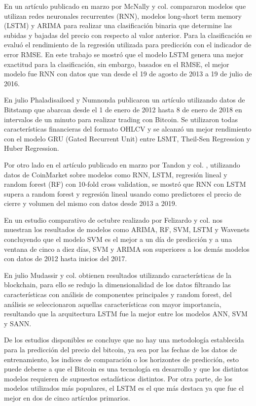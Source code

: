 En un artículo publicado en marzo por McNally y col. \parencite*{mcnallyPredictingPriceBitcoin2018} compararon modelos que utilizan redes neuronales recurrentes (RNN), modelos long-short term memory (LSTM) y ARIMA para realizar una clasificación binaria que determine las subidas y bajadas del precio con respecto al valor anterior. Para la clasificación se evaluó el rendimiento de la regresión utilizada para predicción con el indicador de error RMSE.
En este trabajo se mostró que el modelo LSTM genera una mejor exactitud para la clasificación, sin embargo, basados en el RMSE, el mejor modelo fue RNN con datos que van desde el 19 de agosto de 2013 a 19 de julio de 2016. 

En julio Phaladisailoed y Numnonda \parencite*{phaladisailoedMachineLearningModels2018} publicaron un artículo utilizando datos de Bitstamp que abarcan desde el 1 de enero de 2012 hasta 8 de enero de 2018 en intervalos de un minuto para realizar trading con Bitcoin. Se utilizaron todas características financieras del formato OHLCV y se alcanzó un mejor rendimiento con el modelo GRU (Gated Recurrent Unit) entre LSMT, Theil-Sen Regression y Huber Regression. 


Por otro lado en el artículo publicado en marzo por Tandon y col. \parencite*{tandonBitcoinPriceForecasting2019}, utilizando datos de CoinMarket sobre modelos como RNN, LSTM, regresión lineal y random forest (RF) con 10-fold cross validation, se mostró que RNN con LSTM supera a random forest y regresión lineal usando como predictores el precio de cierre y volumen del mismo con datos desde 2013 a 2019.

En un estudio comparativo de octubre realizado por Felizardo y col. \parencite*{felizardoComparativeStudyBitcoin2019} nos muestran los resultados de modelos como ARIMA, RF, SVM, LSTM y Wavenets concluyendo que el modelo SVM es el mejor a un día de predicción y a una ventana de cinco a diez días, SVM y ARIMA son superiores a los demás modelos con datos de 2012 hasta inicios del 2017.


En julio Mudassir y col. \parencite*{mudassirTimeseriesForecastingBitcoin2020} obtienen resultados utilizando características de la blockchain, para ello se redujo la dimensionalidad de los datos filtrando las características con análisis de componentes principales y random forest, del análisis se seleccionaron aquellas características con mayor importancia, resultando que la arquitectura LSTM fue la mejor entre los modelos ANN, SVM y SANN.

De los estudios disponibles se concluye que no hay una metodología establecida para la predicción del precio del bitcoin, ya sea por las fechas de los datos de entrenamiento, los indices de comparación o los horizontes de predicción, esto puede deberse a que el Bitcoin es una tecnología en desarrollo y que los distintos modelos requieren de supuestos estadísticos distintos. 
Por otra parte, de los modelos utilizados más populares, el LSTM es el que más destaca ya que fue el mejor en dos de cinco artículos primarios.


